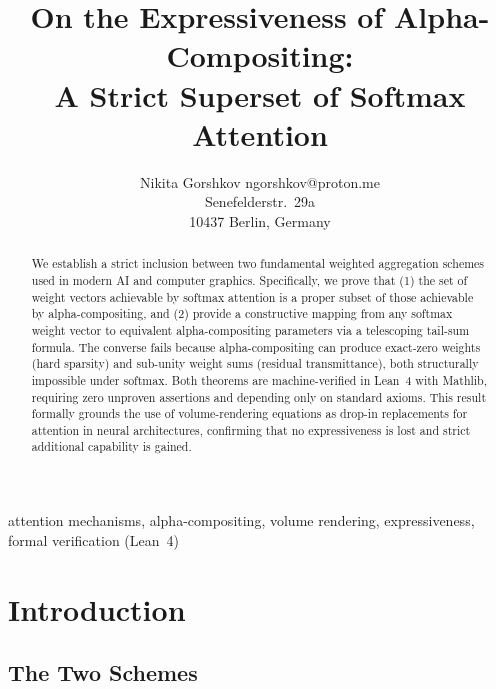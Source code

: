\documentclass[twoside,11pt]{article}
\begin{document}
\title{On the Expressiveness of Alpha-Compositing:\\
A Strict Superset of Softmax Attention}

\author{\name Nikita Gorshkov \email ngorshkov@proton.me \\
       \addr Senefelderstr.\ 29a\\
       10437 Berlin, Germany}

\editor{}

\maketitle

\begin{abstract}%
We establish a strict inclusion between two fundamental weighted aggregation schemes used in modern AI and computer graphics. Specifically, we prove that (1) the set of weight vectors achievable by softmax attention is a proper subset of those achievable by alpha-compositing, and (2) provide a constructive mapping from any softmax weight vector to equivalent alpha-compositing parameters via a telescoping tail-sum formula. The converse fails because alpha-compositing can produce exact-zero weights (hard sparsity) and sub-unity weight sums (residual transmittance), both structurally impossible under softmax. Both theorems are machine-verified in Lean~4 with Mathlib, requiring zero unproven assertions and depending only on standard axioms. This result formally grounds the use of volume-rendering equations as drop-in replacements for attention in neural architectures, confirming that no expressiveness is lost and strict additional capability is gained.
\end{abstract}

\begin{keywords}
  attention mechanisms, alpha-compositing, volume rendering, expressiveness, formal verification (Lean~4)
\end{keywords}

\section{Introduction}

\subsection{The Two Schemes}
\end{document}

